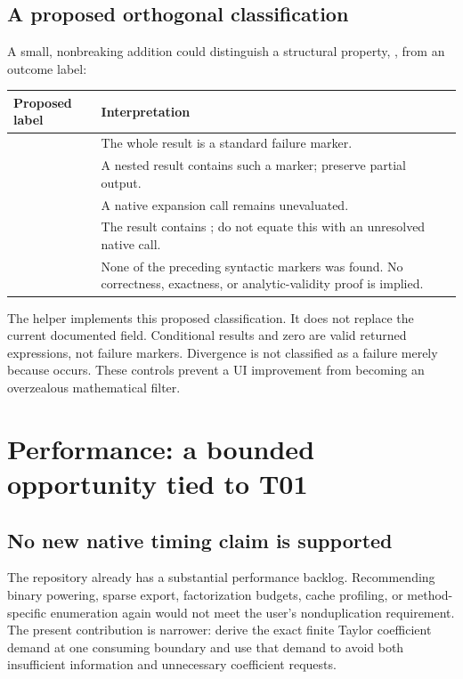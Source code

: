 \documentclass[11pt,letterpaper]{article}
\theoremstyle{definition}\newtheorem{definition}[proposition]{Definition}
\begin{document}
\subsection{A proposed orthogonal classification}
A small, nonbreaking addition could distinguish a structural property,
, from an outcome label:

\begin{tabularx}{\linewidth}{@{}P{1.85in}Y@{}}
\toprule
Proposed label & Interpretation\\
\midrule
{} & The whole result is a standard failure marker.\\
 & A nested result contains such a marker; preserve partial output.\\
 & A native expansion call remains unevaluated.\\
 & The result contains ; do not equate this with an unresolved native call.\\
 & None of the preceding syntactic markers was found. No correctness, exactness, or analytic-validity proof is implied.\\
\bottomrule
\end{tabularx}

The helper  implements this proposed classification.
It does not replace the current documented field. Conditional results and zero
are valid returned expressions, not failure markers. Divergence is not
classified as a failure merely because  occurs. These controls
prevent a UI improvement from becoming an overzealous mathematical filter.

\section{Performance: a bounded opportunity tied to T01}
\subsection{No new native timing claim is supported}
The repository already has a substantial performance backlog. Recommending
binary powering, sparse export, factorization budgets, cache profiling, or
method-specific enumeration again would not meet the user's nonduplication
requirement. The present contribution is narrower: derive the exact finite
Taylor coefficient demand at one consuming boundary and use that demand to
avoid both insufficient information and unnecessary coefficient requests.
\cite{register,review6}
\end{document}

